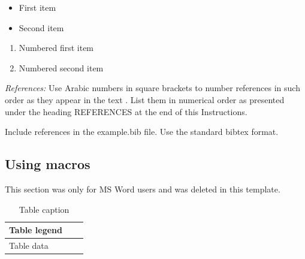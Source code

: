 \begin{itemize}
\item First item
   \item Second item
\end{itemize}
\begin{enumerate}
  \item Numbered first item
  \item Numbered second item
\end{enumerate}

\textit{References:} Use Arabic numbers in square brackets to number
references in such order as they appear in the text . List them in
numerical order as presented under the heading REFERENCES at the end of
this Instructions.

Include references in the example.bib file. Use the standard bibtex
format.

\subsection{Using macros}

This section was only for MS Word users and was deleted in this template.

\begin{table}[h]
        \footnotesize  \onehalfspacing
        \caption{Table caption}
        \begin{tabular}{p{2.40cm}p{2.40cm}p{2.40cm}}
                \hline
                Table legend &  &  \\
                \hline
                Table data & &\\
                \hline
        \end{tabular}
        \label{table2}
\end{table}
